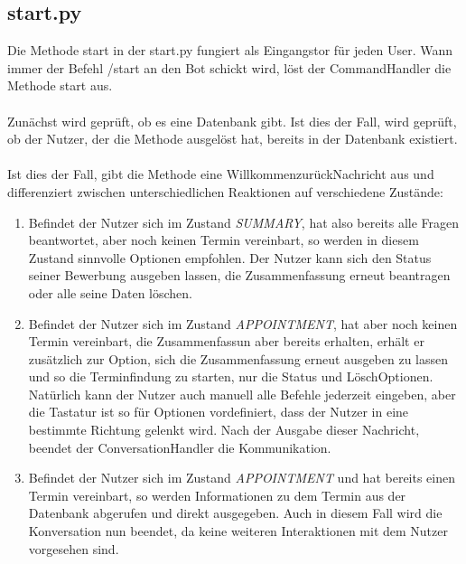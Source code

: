         \subsection{start.py}
            Die Methode start in der start.py fungiert als Eingangstor für jeden User. Wann immer der Befehl /start an den Bot schickt wird, löst der CommandHandler die Methode start aus.\\
            \\
            Zunächst wird geprüft, ob es eine Datenbank gibt. Ist dies der Fall, wird geprüft, ob der Nutzer, der die Methode ausgelöst hat, bereits in der Datenbank existiert. \\
            \\
            Ist dies der Fall, gibt die Methode eine Willkommen\-zurück\-Nachricht aus und differenziert zwischen unterschiedlichen Reaktionen auf verschiedene Zustände:
            \begin{enumerate}
                \item Befindet der Nutzer sich im Zustand \emph{SUMMARY}, hat also bereits alle Fragen beantwortet, aber noch keinen Termin vereinbart, so werden in diesem Zustand sinnvolle Optionen empfohlen. Der Nutzer kann sich den Status seiner Bewerbung ausgeben lassen, die Zusammenfassung erneut beantragen oder alle seine Daten löschen.
                \item Befindet der Nutzer sich im Zustand \emph{APPOINTMENT}, hat aber noch keinen Termin vereinbart, die Zusammenfassun aber bereits erhalten, erhält er zusätzlich zur Option, sich die Zusammenfassung erneut ausgeben zu lassen und so die Terminfindung zu starten, nur die Status\- und Lösch\-Optionen. Natürlich kann der Nutzer auch manuell alle Befehle jederzeit eingeben, aber die Tastatur ist so für Optionen vordefiniert, dass der Nutzer in eine bestimmte Richtung gelenkt wird. Nach der Ausgabe dieser Nachricht, beendet der ConversationHandler die Kommunikation.
                \item Befindet der Nutzer sich im Zustand \emph{APPOINTMENT} und hat bereits einen Termin vereinbart, so werden Informationen zu dem Termin aus der Datenbank abgerufen und direkt ausgegeben. Auch in diesem Fall wird die Konversation nun beendet, da keine weiteren Interaktionen mit dem Nutzer vorgesehen sind.
            \end{enumerate}

